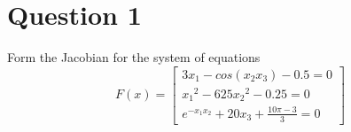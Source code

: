 \section{Question 1}

\begin{question}
    Form the Jacobian for the system of equations 
    \begin{equation}
        F(x) = \left[\begin{matrix}3x_1 − cos(x_2x_3) − 0.5 = 0\\  {x_1}^2 −  625{x_2}^2 − 0.25 = 0\\ e^{−x_1x_2} + 20x_3 + \tfrac{10\pi−3}{3}  = 0\end{matrix}\right]
    \end{equation}
\end{question}

\begin{answer}
    
\end{answer}